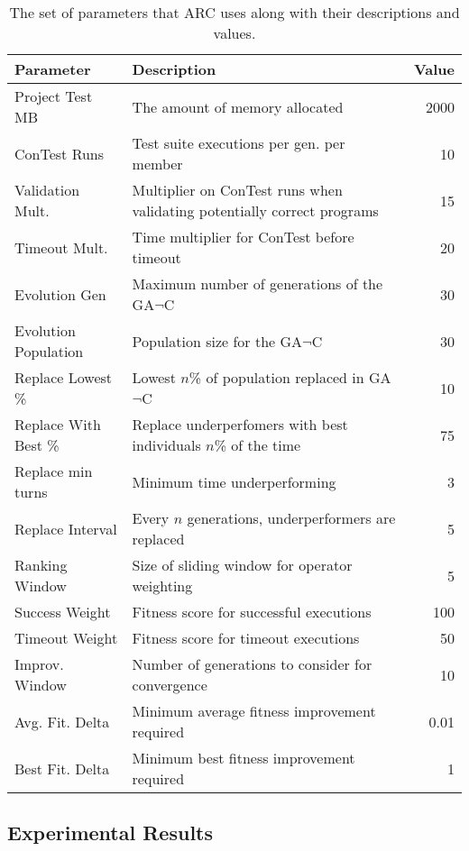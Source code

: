 \documentclass[runningheads,a4paper]{llncs}
\begin{document}
\begin{table}[t!]
\caption{The set of parameters that ARC uses along with their descriptions and values.}
\begin{center}
\lstset{basicstyle=\scriptsize}
\begin{tabular}{|l|p{7.5cm}|r|}
\hline
\textbf{Parameter} & \textbf{Description} & \textbf{Value}\\
\hline
Project Test MB & The amount of memory allocated  & 2000\\
\hline
ConTest Runs & Test suite executions per gen. per member & 10\\
\hline
Validation Mult. & Multiplier on ConTest runs when validating potentially correct programs & 15\\
\hline
Timeout Mult. & Time multiplier for ConTest before timeout & 20\\
\hline
Evolution Gen & Maximum number of generations of the GA$\neg$C & 30\\
\hline
Evolution Population & Population size for the GA$\neg$C & 30\\
\hline
Replace Lowest \% & Lowest $n$\% of population replaced in GA$\neg$C & 10\\
\hline
Replace With Best \% & Replace underperfomers with best individuals $n$\% of the time & 75\\
\hline
Replace min turns & Minimum time underperforming & 3\\
\hline
Replace Interval & Every $n$ generations, underperformers are replaced & 5\\
\hline
Ranking Window & Size of sliding window for operator weighting & 5\\
\hline
Success Weight & Fitness score for successful executions & 100\\
\hline
Timeout Weight & Fitness score for timeout executions & 50\\
\hline
Improv. Window & Number of generations to consider for convergence & 10\\
\hline
Avg. Fit. Delta & Minimum average fitness improvement required & 0.01\\
\hline
Best Fit. Delta & Minimum best fitness improvement required & 1\\
\hline
\end{tabular}
\label{tbl:used_parameters}
\end{center}
\end{table}

\subsection{Experimental Results}
\label{sec:experimental_results}
\end{document}
